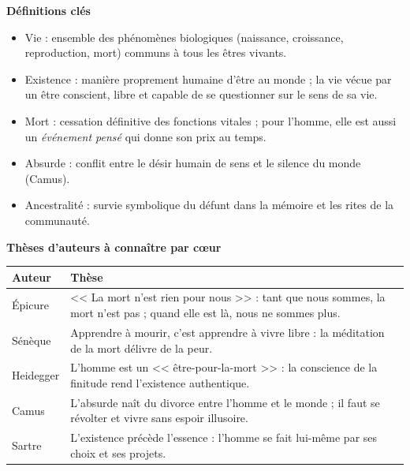 \documentclass[11pt]{article}
\newcommand{\cle}[1]{{\popxbold\color{popdark}#1}}
\begin{document}
\begin{bilan}
\textbf{D\'efinitions cl\'es}
\begin{itemize}
\item \cle{Vie} : ensemble des ph\'enom\`enes biologiques (naissance, croissance, reproduction, mort) communs \`a tous les \^etres vivants.
\item \cle{Existence} : mani\`ere proprement humaine d'\^etre au monde ; la vie v\'ecue par un \^etre conscient, libre et capable de se questionner sur le sens de sa vie.
\item \cle{Mort} : cessation d\'efinitive des fonctions vitales ; pour l'homme, elle est aussi un \emph{\'ev\'enement pens\'e} qui donne son prix au temps.
\item \cle{Absurde} : conflit entre le d\'esir humain de sens et le silence du monde (Camus).
\item \cle{Ancestralit\'e} : survie symbolique du d\'efunt dans la m\'emoire et les rites de la communaut\'e.
\end{itemize}

\textbf{Th\`eses d'auteurs \`a conna\^itre par c\oe ur}
\begin{center}
\begin{tabularx}{\linewidth}{|l|X|}
\hline
\rowcolor{popblueL}\textbf{Auteur} & \textbf{Th\`ese} \\
\hline
\'Epicure & << La mort n'est rien pour nous >> : tant que nous sommes, la mort n'est pas ; quand elle est l\`a, nous ne sommes plus. \\
\hline
S\'en\`eque & Apprendre \`a mourir, c'est apprendre \`a vivre libre : la m\'editation de la mort d\'elivre de la peur. \\
\hline
Heidegger & L'homme est un << \^etre-pour-la-mort >> : la conscience de la finitude rend l'existence authentique. \\
\hline
Camus & L'absurde na\^it du divorce entre l'homme et le monde ; il faut se r\'evolter et vivre sans espoir illusoire. \\
\hline
Sartre & L'existence pr\'ec\`ede l'essence : l'homme se fait lui-m\^eme par ses choix et ses projets. \\
\hline
\end{tabularx}
\end{center}


\end{bilan}
\end{document}
